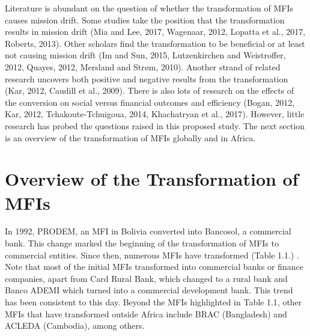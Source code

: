 \documentclass[a4paper, nobind]{templates/ociamthesis}
\begin{document}
Literature is abundant on the question of whether the transformation of MFIs causes mission drift. Some studies take the position that the transformation results in mission drift (Mia and Lee, 2017, Wagenaar, 2012, Lopatta et al., 2017, Roberts, 2013). Other scholars find the transformation to be beneficial or at least not causing mission drift (Im and Sun, 2015, Lutzenkirchen and Weistroffer, 2012, Quayes, 2012, Mersland and Strøm, 2010). Another strand of related research uncovers both positive and negative results from the transformation (Kar, 2012, Caudill et al., 2009). There is also lots of research on the effects of the conversion on social versus financial outcomes and efficiency (Bogan, 2012, Kar, 2012, Tchakoute-Tchuigoua, 2014, Khachatryan et al., 2017). However, little research has probed the questions raised in this proposed study. The next section is an overview of the transformation of MFIs globally and in Africa.

\hypertarget{overview-of-the-transformation-of-mfis}{%
\section{Overview of the Transformation of MFIs}\label{overview-of-the-transformation-of-mfis}}

\noindent In 1992, PRODEM, an MFI in Bolivia converted into Bancosol, a commercial bank. This change marked the beginning of the transformation of MFIs to commercial entities. Since then, numerous MFIs have transformed (Table 1.1.) . Note that most of the initial MFIs transformed into commercial banks or finance companies, apart from Card Rural Bank, which changed to a rural bank and Banco ADEMI which turned into a commercial development bank. This trend has been consistent to this day. Beyond the MFIs highlighted in Table 1.1, other MFIs that have transformed outside Africa include BRAC (Bangladesh) and ACLEDA (Cambodia), among others.
\end{document}
